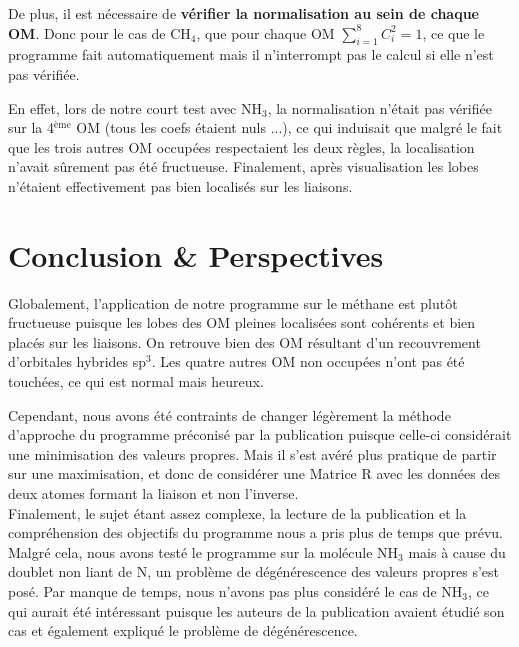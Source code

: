 \documentclass[12pt]{article}
\begin{document}
De plus, il est nécessaire de \textbf{vérifier la normalisation au sein de chaque OM}. Donc pour le cas de CH$_4$, que pour chaque OM \( \sum_{i=1}^{8} C_i^{2} = 1\), ce que le programme fait automatiquement mais il n'interrompt pas le calcul si elle n'est pas vérifiée.

En effet, lors de notre court test avec NH$_3$, la normalisation n'était pas vérifiée sur la 4$^{\text{ème}}$ OM (tous les coefs étaient nuls ...), ce qui induisait que malgré le fait que les trois autres OM occupées respectaient les deux règles, la localisation n'avait sûrement pas été fructueuse. Finalement, après visualisation les lobes n'étaient effectivement pas bien localisés sur les liaisons.


\section{Conclusion \& Perspectives}

Globalement, l'application de notre programme sur le méthane est plutôt fructueuse puisque les lobes des OM pleines localisées sont cohérents et bien placés sur les liaisons. On retrouve bien des OM résultant d'un recouvrement d’orbitales hybrides sp$^3$. Les quatre autres OM non occupées n'ont pas été touchées, ce qui est normal mais heureux.

Cependant, nous avons été contraints de changer légèrement la méthode d'approche du programme préconisé par la publication puisque celle-ci considérait une minimisation des valeurs propres. Mais il s'est avéré plus pratique de partir sur une maximisation, et donc de considérer une Matrice R avec les données des deux atomes formant la liaison et non l'inverse. \\

Finalement, le sujet étant assez complexe, la lecture de la publication et la compréhension des objectifs du programme nous a pris plus de temps que prévu. Malgré cela, nous avons testé le programme sur la molécule NH$_3$ mais à cause du doublet non liant de N, un problème de dégénérescence des valeurs propres s'est posé. Par manque de temps, nous n'avons pas plus considéré le cas de NH$_3$, ce qui aurait été intéressant puisque les auteurs de la publication avaient étudié son cas et également expliqué le problème de dégénérescence.
\end{document}
